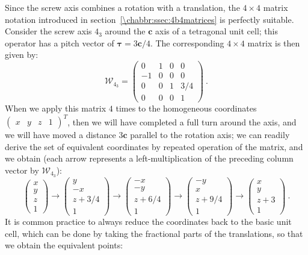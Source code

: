 Since the screw axis combines a rotation with a translation, the $4\times 4$ matrix notation introduced in section~\ref{\chabbr:ssec:4b4matrices} is perfectly suitable. Consider the screw axis $4_3$ around the $\mathbf{c}$ axis of a tetragonal unit cell; this operator has a pitch vector of $\bm{\tau}=3\mathbf{c}/4$. The corresponding $4\times 4$ matrix is then given by:
\[
	\mathcal{W}_{4_3} = \begin{pmatrix} 0 & 1 & 0 & 0\\ -1 & 0 & 0 & 0\\ 0 & 0 & 1 & 3/4\\ 0 & 0 & 0 & 1\end{pmatrix}\ .
\]
When we apply this matrix $4$ times to the homogeneous coordinates $\begin{pmatrix}x&y&z&1\end{pmatrix}^T$, then we will have completed a full turn around the axis, and we will have moved a distance $3\mathbf{c}$ parallel to the rotation axis; we can readily derive the set of equivalent coordinates by repeated operation of the matrix, and we obtain (each arrow represents a left-multiplication of the preceding column vector by $\mathcal{W}_{4_3}$):
\[
	\begin{pmatrix}x\\ y\\ z\\ 1\end{pmatrix}\longrightarrow 	\begin{pmatrix}y\\ -x\\ z+3/4\\ 1\end{pmatrix}\longrightarrow	\begin{pmatrix}-x\\ -y\\ z+6/4\\ 1\end{pmatrix}\longrightarrow	\begin{pmatrix}-y\\ x\\ z+9/4\\ 1\end{pmatrix}\longrightarrow\begin{pmatrix}x\\ y\\ z+3\\ 1\end{pmatrix}\ .
\]
It is common practice to always reduce the coordinates back to the basic unit cell, which can be done by taking the fractional parts of the translations, so that we obtain the equivalent points:

